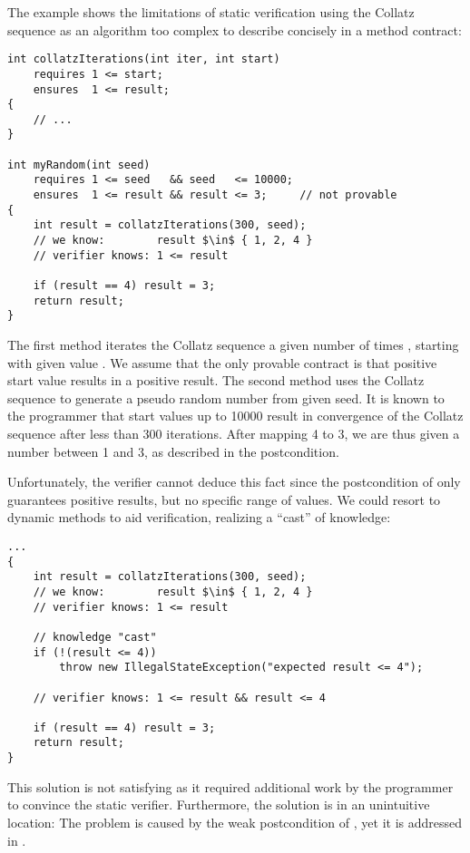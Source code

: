 The example shows the limitations of static verification using the Collatz sequence as an algorithm too complex to describe concisely in a method contract:
\begin{lstlisting}
int collatzIterations(int iter, int start)
    requires 1 <= start;
    ensures  1 <= result;
{
    // ...
}

int myRandom(int seed)
    requires 1 <= seed   && seed   <= 10000;
    ensures  1 <= result && result <= 3;     // not provable
{
    int result = collatzIterations(300, seed);
    // we know:        result $\in$ { 1, 2, 4 }
    // verifier knows: 1 <= result
    
    if (result == 4) result = 3;
    return result;
}
\end{lstlisting}
The first method  iterates the Collatz sequence a given number of times , starting with given value .
We assume that the only provable contract is that positive start value results in a positive result.
The second method  uses the Collatz sequence to generate a pseudo random number from given seed.
It is known to the programmer that start values up to 10000 result in convergence of the Collatz sequence after less than 300 iterations.
After mapping 4 to 3, we are thus given a number between 1 and 3, as described in the postcondition.

Unfortunately, the verifier cannot deduce this fact since the postcondition of  only guarantees positive results, but no specific range of values.
We could resort to dynamic methods to aid verification, realizing a “cast” of knowledge:

\begin{lstlisting}
...
{
    int result = collatzIterations(300, seed);
    // we know:        result $\in$ { 1, 2, 4 }
    // verifier knows: 1 <= result
    
    // knowledge "cast"
    if (!(result <= 4))
        throw new IllegalStateException("expected result <= 4");

    // verifier knows: 1 <= result && result <= 4 
    
    if (result == 4) result = 3;
    return result;
}
\end{lstlisting}

This solution is not satisfying as it required additional work by the programmer to convince the static verifier.
Furthermore, the solution is in an unintuitive location:
The problem is caused by the weak postcondition of , yet it is addressed in .

